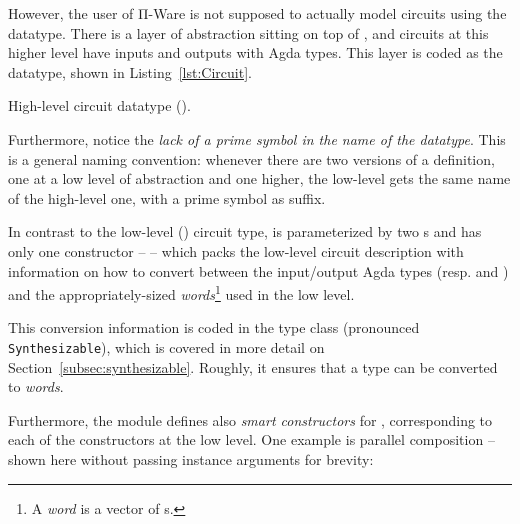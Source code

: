             However, the user of Π-Ware is not supposed to actually model circuits using the  datatype.
            There is a layer of abstraction sitting on top of ,
            and circuits at this higher level have inputs and outputs with Agda types.
            This layer is coded as the  datatype, shown in Listing~\ref{lst:Circuit}.


            \begin{listing}[h]
                \caption{High-level circuit datatype ().\label{lst:Circuit}}
            \end{listing}

            Furthermore, notice the \emph{lack of a prime symbol in the name of the datatype}.
            This is a general naming convention:
            whenever there are two versions of a definition, one at a low level of abstraction and one higher,
            the low-level gets the same name of the high-level one, with a prime symbol as suffix.

            In contrast to the low-level () circuit type,  is parameterized by two s
            and has only one constructor –  – which packs the low-level circuit description
            with information on how to convert between the input/output Agda types (resp.  and )
            and the appropriately-sized \emph{words}\footnote{A \emph{word} is a vector of s.}
            used in the low level.

            This conversion information is coded in the  type class (pronounced \texttt{Synthesizable}),
            which is covered in more detail on Section~\ref{subsec:synthesizable}.
            Roughly, it ensures that a type can be converted to \emph{words}.

            Furthermore, the  module defines also \emph{smart constructors} for ,
            corresponding to each of the constructors at the low level.
            One example is parallel composition – shown here without passing instance arguments for brevity:

            \begin{center}
            \end{center}

